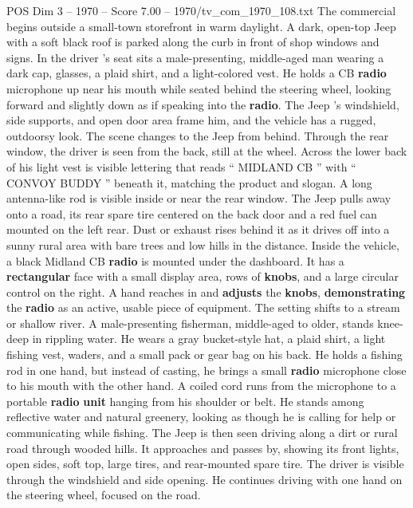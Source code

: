\begin{textsample}{POS Dim 3 – 1970 – Score 7.00 – 1970/tv\_com\_1970\_108.txt}  \label{ex:f3_pos_038}
The commercial begins outside a small-town storefront in warm daylight.
A dark, open-top Jeep with a soft black roof is parked along the curb in front of shop windows and signs.
In the driver ’s seat sits a male-presenting, middle-aged man wearing a dark cap, glasses, a plaid shirt, and a light-colored vest.
He holds a CB \textbf{radio} microphone up near his mouth while seated behind the steering wheel, looking forward and slightly down as if speaking into the \textbf{radio}.
The Jeep ’s windshield, side supports, and open door area frame him, and the vehicle has a rugged, outdoorsy look.
The scene changes to the Jeep from behind.
Through the rear window, the driver is seen from the back, still at the wheel.
Across the lower back of his light vest is visible lettering that reads “ MIDLAND CB ” with “ CONVOY BUDDY ” beneath it, matching the product and slogan.
A long antenna-like rod is visible inside or near the rear window.
The Jeep pulls away onto a road, its rear spare tire centered on the back door and a red fuel can mounted on the left rear.
Dust or exhaust rises behind it as it drives off into a sunny rural area with bare trees and low hills in the distance.
Inside the vehicle, a black Midland CB \textbf{radio} is mounted under the dashboard.
It has a \textbf{rectangular} face with a small display area, rows of \textbf{knobs}, and a large circular control on the right.
A hand reaches in and \textbf{adjusts} the \textbf{knobs}, \textbf{demonstrating} the \textbf{radio} as an active, usable piece of equipment.
The setting shifts to a stream or shallow river.
A male-presenting fisherman, middle-aged to older, stands knee-deep in rippling water.
He wears a gray bucket-style hat, a plaid shirt, a light fishing vest, waders, and a small pack or gear bag on his back.
He holds a fishing rod in one hand, but instead of casting, he brings a small \textbf{radio} microphone close to his mouth with the other hand.
A coiled cord runs from the microphone to a portable \textbf{radio} \textbf{unit} hanging from his shoulder or belt.
He stands among reflective water and natural greenery, looking as though he is calling for help or communicating while fishing.
The Jeep is then seen driving along a dirt or rural road through wooded hills.
It approaches and passes by, showing its front lights, open sides, soft top, large tires, and rear-mounted spare tire.
The driver is visible through the windshield and side opening.
He continues driving with one hand on the steering wheel, focused on the road.

\end{textsample}
